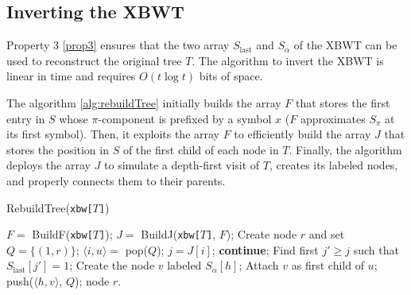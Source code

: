 \subsection{Inverting the XBWT}
Property 3 \ref{prop3} ensures that the two array $S_{\text{last}}$ and $S_{\alpha}$ of the XBWT can be used to reconstruct the original tree $T$. The algorithm to invert the XBWT is linear in time and requires $O(t \log t)$ bits of space.

The algorithm \ref{alg:rebuildTree} initially builds the array $F$ that stores the first entry in $S$ whose $\pi$-component is prefixed by a symbol $x$ ($F$ approximates $S_{\pi}$ at its first symbol). Then, it exploits the array $F$ to efficiently build the array $J$ that stores the position in $S$ of the first child of each node in $T$. Finally, the algorithm deploys the array $J$ to
simulate a depth-first visit of $T$, creates its labeled nodes, and properly connects them to their parents. 

\begin{algorithm}[H]
    \caption{RebuildTree(\texttt{xbw[$T$]})}
    \label{alg:rebuildTree}
    \begin{algorithmic}[1]
    \State $F = $ BuildF(\texttt{xbw[$T$]}); 
    \State $J = $ BuildJ(\texttt{xbw[$T$]}, $F$); 
    \State Create node $r$ and set $Q = \{(1, r)\}$; 
     
        \State $\langle i, u \rangle = $ pop($Q$);
        \State $j = J[i]$; 
         
            \State \textbf{continue};
        \EndIf
        \State Find first $j' \geq j$ such that $S_{\text{last}}[j'] = 1$; 
         
            \State Create the node $v$ labeled $S_\alpha[h]$;
            \State Attach $v$ as first child of $u$;
            \State push($\langle h, v \rangle$, $Q$);
        \EndFor
    \EndWhile
    \State \Return node $r$.
    \end{algorithmic}
\end{algorithm}

